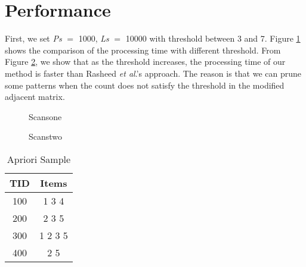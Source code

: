 \section{Performance}
First, we set \emph{Ps} $=$ 1000, \emph{Ls} $=$ 10000 with threshold
between 3 and 7. Figure \ref{SCANS1} shows the comparison of the
processing time with different threshold. From Figure \ref{SCANS2},
we show that as the threshold increases, the processing time of our
method is faster than Rasheed \emph{et al}.'s approach. The reason
is that we can prune some patterns when the count does not satisfy
the threshold in the modified adjacent matrix.

\newpage

\begin{figure}
\begin{center}
\centerline{}
\caption{Scansone} \label{SCANS1}
\end{center}
\end{figure}

\begin{figure}
\begin{center}
\centerline{}
\caption{Scanstwo} \label{SCANS2}
\end{center}
\end{figure}

\newpage

\begin{table}[]
\centering \caption{Apriori Sample} \vspace*{12pt}
\label{Abbre}
\begin{tabular}{|c|c|}
\hline
\textbf{TID}   & \textbf{Items} \\
\hline 100              & 1 3 4       \\
\hline 200              & 2 3 5       \\
\hline 300              & 1 2 3 5     \\
\hline 400              & 2 5         \\
\hline
\end{tabular}
\end{table}
